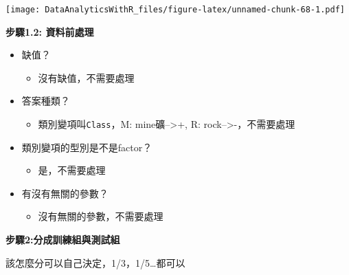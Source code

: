 \documentclass[
]{book}
\newenvironment{Shaded}{\begin{snugshade}}{\end{snugshade}}
\newcommand{\CommentTok}[1]{\textcolor[rgb]{0.56,0.35,0.01}{\textit{#1}}}
\newcommand{\DecValTok}[1]{\textcolor[rgb]{0.00,0.00,0.81}{#1}}
\newcommand{\KeywordTok}[1]{\textcolor[rgb]{0.13,0.29,0.53}{\textbf{#1}}}
\newcommand{\NormalTok}[1]{#1}
\newcommand{\OperatorTok}[1]{\textcolor[rgb]{0.81,0.36,0.00}{\textbf{#1}}}
\newcommand{\StringTok}[1]{\textcolor[rgb]{0.31,0.60,0.02}{#1}}
\providecommand{\tightlist}{%
  \setlength{\itemsep}{0pt}\setlength{\parskip}{0pt}}
\begin{document}
\texttt{[image: DataAnalyticsWithR\_files/figure-latex/unnamed-chunk-68-1.pdf]}

\textbf{步驟1.2: 資料前處理}

\begin{itemize}
\tightlist
\item
  缺值？

  \begin{itemize}
  \tightlist
  \item
    沒有缺值，不需要處理
  \end{itemize}
\item
  答案種類？

  \begin{itemize}
  \tightlist
  \item
    類別變項叫\texttt{Class}，M: mine礦--\textgreater+, R: rock--\textgreater-，不需要處理
  \end{itemize}
\item
  類別變項的型別是不是factor？

  \begin{itemize}
  \tightlist
  \item
    是，不需要處理
  \end{itemize}
\item
  有沒有無關的參數？

  \begin{itemize}
  \tightlist
  \item
    沒有無關的參數，不需要處理
  \end{itemize}
\end{itemize}

\textbf{步驟2:分成訓練組與測試組}

該怎麼分可以自己決定，1/3，1/5\ldots 都可以

\begin{Shaded}
\end{Shaded}
\end{document}
